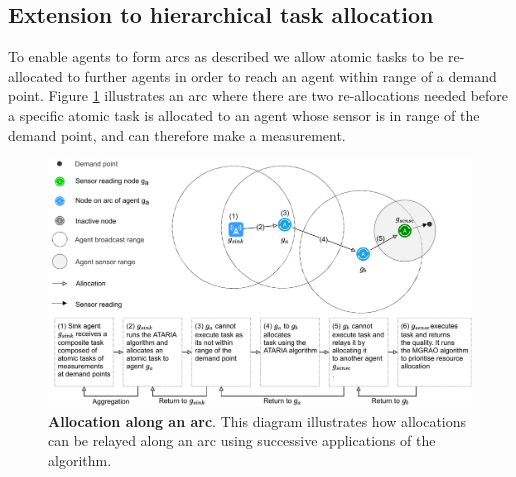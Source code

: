 \subsection{Extension to hierarchical task allocation}

To enable agents to form arcs as described we allow atomic tasks to be re-allocated to further agents in order to reach an agent within range of a demand point. Figure \ref{fig:arc-flow} illustrates an arc where there are two re-allocations needed before a specific atomic task is allocated to an agent whose sensor is in range of the demand point, and can therefore make a measurement.

\begin{figure}[ht]
	\centering
	\includegraphics[width=0.8\linewidth]{arc-flow}
	\caption{\textbf{Allocation along an arc}. This diagram illustrates how allocations can be relayed along an arc using successive applications of the \acronymATARIA{}{} algorithm.}
	\label{fig:arc-flow}
\end{figure}

